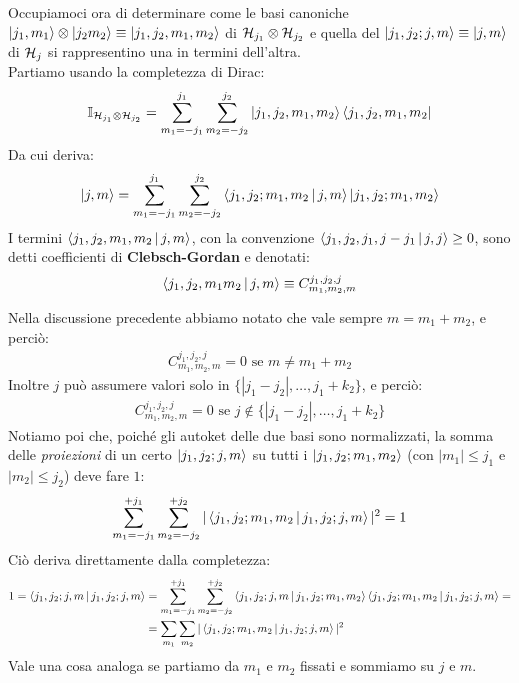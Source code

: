 \documentclass[../../FisicaTeorica.tex]{subfiles}
\begin{document}
Occupiamoci ora di determinare come le basi canoniche $\Ket{j_1, m_1} \otimes \Ket{j_2 m_2} \equiv \Ket{j_1, j_2, m_1, m_2}$ di $\mathcal{H}_{j_1} \otimes \mathcal{H}_{j_2}$ e quella del  $\Ket{j_1, j_2;j,m}\equiv \Ket{j,m}$ di $\mathcal{H}_{j}$ si rappresentino una in termini dell'altra.\\
Partiamo usando la completezza di Dirac:
\begin{align*}
\mathbb{I}_{\mathcal{H}_{j_1}\otimes \mathcal{H}_{j_2}} = \sum_{m_1 = -j_1}^{j_1} \sum_{m_2 = -j_2}^{j_2} \Ket{j_1, j_2, m_1, m_2}\Bra{j_1, j_2, m_1, m_2}
\end{align*}
Da cui deriva:
\begin{align}
\Ket{j,m}= \sum_{m_1 = -j_1}^{j_1} \sum_{m_2 = -j_2}^{j_2} \Braket{j_1, j_2; m_1, m_2| j, m} \Ket{j_1, j_2; m_1, m_2}
\label{eqn:completezza-momento-composto}
\end{align}
I termini $\Braket{j_1, j_2, m_1, m_2 | j, m}$, con la convenzione $\Braket{j_1, j_2, j_1, j - j_1 | j, j} \geq 0$, sono detti coefficienti di \textbf{Clebsch-Gordan} e denotati:
\begin{align*}
\Braket{j_1, j_2, m_1 m_2 | j, m}  \equiv C^{j_1, j_2, j}_{m_1, m_2, m}
\end{align*}

Nella discussione precedente abbiamo notato che vale sempre $m=m_1+m_2$, e perciò:
\begin{align*}
C^{j_1, j_2, j}_{m_1,m_2, m} =0 \text{ se } m\neq m_1 + m_2
\end{align*}
Inoltre $j$ può assumere valori solo in $\{|j_1-j_2|, \dots, j_1+k_2\}$, e perciò:
\begin{align*}
C^{j_1, j_2, j}_{m_1, m_2, m} =0 \text{ se } j \notin \{|j_1-j_2|, \dots, j_1+k_2\}
\end{align*}
Notiamo poi che, poiché gli autoket delle due basi sono normalizzati, la somma delle \textit{proiezioni} di un certo $\Ket{j_1, j_2; j, m}$ su tutti i $\Ket{j_1, j_2; m_1, m_2}$ (con $|m_1| \leq j_1$ e $|m_2|\leq j_2$) deve fare $1$:
\begin{align*}
\sum_{m_1=-j_1}^{+j_1} \sum_{m_2 = -j_2}^{+j_2} |\Braket{j_1, j_2; m_1, m_2| j_1, j_2; j, m}|^2 = 1
\end{align*}
Ciò deriva direttamente dalla completezza:
\begin{align}\nonumber
1=\Braket{j_1, j_2; j,m|j_1, j_2; j, m} &= \sum_{m_1=-j_1}^{+j_1} \sum_{m_2 = -j_2}^{+j_2} \Braket{j_1, j_2; j, m| j_1, j_2; m_1, m_2}\Braket{j_1, j_2; m_1, m_2|j_1, j_2;j,m} =\\
&=\sum_{m_1}\sum_{m_2} |\Braket{j_1, j_2; m_1, m_2|j_1, j_2;j,m}|^2
\label{eqn:normalizzazione-momento-composto}
\end{align}
Vale una cosa analoga se partiamo da $m_1$ e $m_2$ fissati e sommiamo su $j$ e $m$.\\
\end{document}
